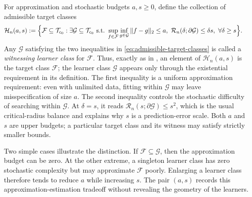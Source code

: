 \documentclass[11pt]{article}
\begin{document}
For approximation and stochastic budgets \(a,s\geq0\), define the collection
of admissible target classes
\begin{align}
\mathcal H_n(a,s)
:=
\Bigl\{\mathcal F\subseteq\mathcal T_{c_0}:\;&
\exists \mathcal G\subseteq\mathcal T_{c_0}\ 
\text{s.t.}\ 
\sup_{f\in\mathcal F}\inf_{g\in\mathcal G}
\|f-g\|_2\leq a,\ 
\mathcal R_n(\delta;\partial\mathcal G)
\leq\delta s,
\ \forall\delta\geq s
\Bigr\}.
\label{eq:admissible-target-classes}
\end{align}
Any \(\mathcal G\) satisfying the two inequalities in
\eqref{eq:admissible-target-classes} is called a \emph{witnessing learner
class} for \(\mathcal F\).  Thus, exactly as in \citet{gu2025open}, an element of
\(\mathcal H_n(a,s)\) is the target class \(\mathcal F\); the learner class
\(\mathcal G\) appears only through the existential requirement in its
definition.  The first inequality is a uniform approximation requirement:
even with unlimited data, fitting within \(\mathcal G\) may leave
misspecification of size \(a\).  The second inequality controls the stochastic
difficulty of searching within \(\mathcal G\).  At \(\delta=s\), it reads
\(\mathcal R_n(s;\partial\mathcal G)\leq s^2\), which is the usual
critical-radius balance and explains why \(s\) is a prediction-error scale.
Both \(a\) and \(s\) are upper budgets; a particular target class and its
witness may satisfy strictly smaller bounds.

Two simple cases illustrate the distinction.  If
\(\mathcal F\subseteq\mathcal G\), then the approximation budget can be
zero.  At the other extreme, a singleton learner class has zero stochastic
complexity but may approximate \(\mathcal F\) poorly.  Enlarging a learner
class therefore tends to reduce \(a\) while increasing \(s\).  The pair \((a,s)\) records this
approximation-estimation tradeoff without revealing the geometry of the
learners.
\end{document}
